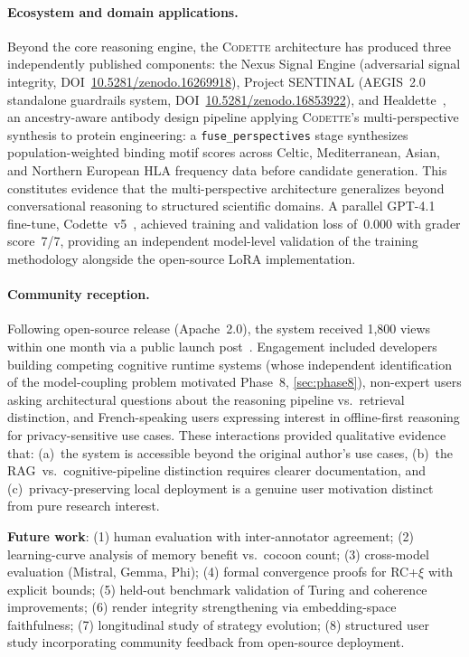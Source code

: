 \documentclass[11pt,a4paper]{article}
\newcommand{\codette}{\textsc{Codette}}
\begin{document}
\paragraph{Ecosystem and domain applications.}
Beyond the core reasoning engine, the \codette{} architecture has produced
three independently published components: the Nexus Signal Engine
(adversarial signal integrity, DOI~\href{https://doi.org/10.5281/zenodo.16269918}{10.5281/zenodo.16269918}),
Project SENTINAL (AEGIS~2.0 standalone guardrails system,
DOI~\href{https://doi.org/10.5281/zenodo.16853922}{10.5281/zenodo.16853922}),
and Healdette~\citep{harrison2025healdette}, an ancestry-aware antibody
design pipeline applying \codette{}'s multi-perspective synthesis to protein
engineering: a \texttt{fuse\_perspectives} stage synthesizes population-weighted
binding motif scores across Celtic, Mediterranean, Asian, and Northern European
HLA frequency data before candidate generation. This constitutes evidence that
the multi-perspective architecture generalizes beyond conversational reasoning
to structured scientific domains. A parallel GPT-4.1 fine-tune,
Codette~v5~\citep{harrison2025codettev5}, achieved training and validation
loss of~0.000 with grader score~7/7, providing an independent model-level
validation of the training methodology alongside the open-source LoRA
implementation.

\paragraph{Community reception.}
Following open-source release (Apache~2.0), the system received 1,800 views
within one month via a public launch post~\citep{harrison2025codetteroom}.
Engagement included developers building competing cognitive runtime systems
(whose independent identification of the model-coupling problem motivated
Phase~8, \cref{sec:phase8}), non-expert users asking architectural questions
about the reasoning pipeline vs.\ retrieval distinction, and French-speaking
users expressing interest in offline-first reasoning for privacy-sensitive
use cases. These interactions provided qualitative evidence that: (a)~the
system is accessible beyond the original author's use cases, (b)~the
RAG~vs.~cognitive-pipeline distinction requires clearer documentation, and
(c)~privacy-preserving local deployment is a genuine user motivation distinct
from pure research interest.

\textbf{Future work}: (1) human evaluation with inter-annotator agreement;
(2) learning-curve analysis of memory benefit vs.\ cocoon count; (3)
cross-model evaluation (Mistral, Gemma, Phi); (4) formal convergence proofs
for RC+$\xi$ with explicit bounds; (5) held-out benchmark validation of Turing
and coherence improvements; (6) render integrity strengthening via
embedding-space faithfulness; (7) longitudinal study of strategy evolution;
(8) structured user study incorporating community feedback from open-source
deployment.
\end{document}
